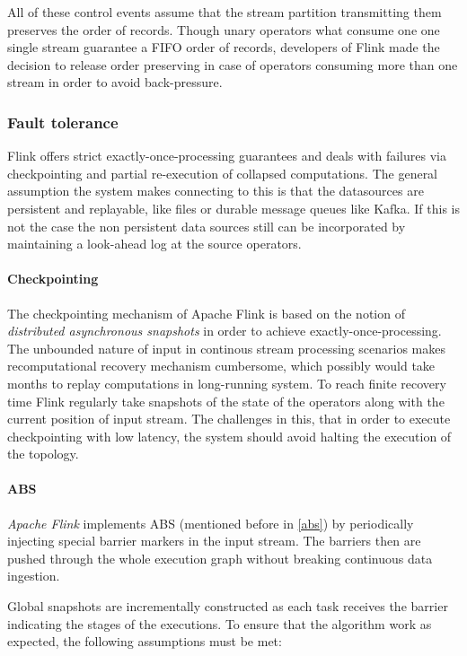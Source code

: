 All of these control events assume that the stream partition transmitting them preserves  the order of records.  Though unary operators what consume one  
one single stream guarantee  a FIFO order of records, developers of Flink made the decision to release order preserving in case of operators consuming more than one stream in order to avoid back-pressure.

\subsubsection{Fault tolerance}

Flink offers strict  exactly-once-processing guarantees and deals with failures  via checkpointing and partial re-execution of collapsed computations. The general assumption the system makes connecting to this is that the datasources are persistent and replayable, like files or durable message queues like Kafka. If this is not the case the non persistent data sources still can be incorporated by maintaining a look-ahead log at the source operators.

\paragraph{Checkpointing}\label{flinkft}
The checkpointing mechanism of Apache Flink is based on the notion of \textit{distributed asynchronous snapshots} in order to achieve exactly-once-processing. The unbounded nature of input in continous stream processing scenarios makes recomputational recovery mechanism cumbersome, which possibly would take months to replay computations in long-running system. 
To reach finite recovery time Flink regularly take snapshots of the state of the operators along with the current position of input stream. The challenges in this, that in order to execute checkpointing with low latency, the system should avoid halting the execution of the topology. 

\paragraph{ABS}
\textit{Apache Flink} implements ABS (mentioned before in \ref{abs}) by periodically injecting special barrier markers in the input stream. The barriers then are pushed through the whole execution graph without breaking continuous data ingestion.

Global snapshots are incrementally constructed as each task receives the barrier indicating the stages of the executions. To ensure that the algorithm work as expected, the following assumptions must be met:

